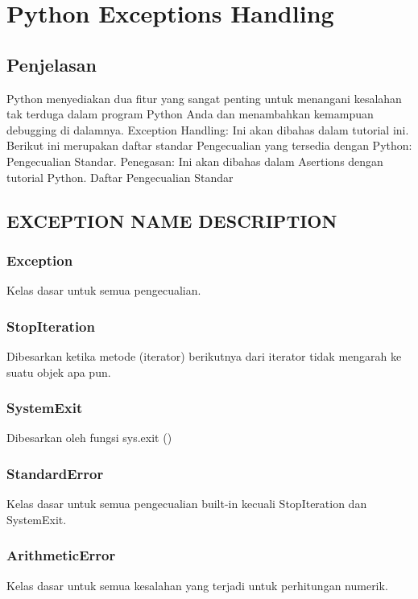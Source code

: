 
                                          \section{Python Exceptions Handling}

\subsection{Penjelasan}
Python menyediakan dua fitur yang sangat penting untuk menangani kesalahan tak terduga dalam program Python Anda dan menambahkan kemampuan debugging di dalamnya.
Exception Handling: Ini akan dibahas dalam tutorial ini. Berikut ini merupakan daftar standar Pengecualian yang tersedia dengan Python: Pengecualian Standar.
Penegasan: Ini akan dibahas dalam Asertions dengan tutorial Python. 
Daftar Pengecualian Standar 
\subsection{EXCEPTION NAME DESCRIPTION}

\subsubsection{Exception}
Kelas dasar untuk semua pengecualian.

\subsubsection{StopIteration}
Dibesarkan ketika metode (iterator) berikutnya dari iterator tidak mengarah ke suatu objek apa pun.

\subsubsection{SystemExit}
Dibesarkan oleh fungsi sys.exit ()

\subsubsection{StandardError}
Kelas dasar untuk semua pengecualian built-in kecuali StopIteration dan SystemExit.

\subsubsection{ArithmeticError}
Kelas dasar untuk semua kesalahan yang terjadi untuk perhitungan numerik.

